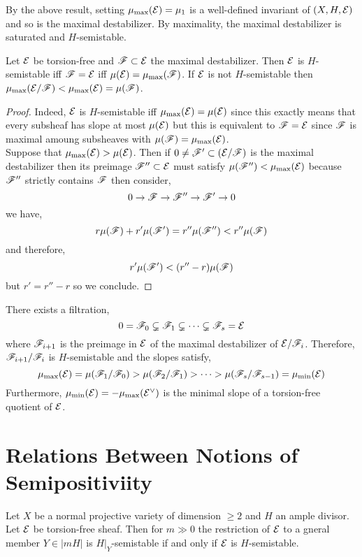 \documentclass[12pt]{article}
\begin{document}
\begin{defn}
By the above result, setting $\mu_{\max}(\mathcal{E}) = \mu_1$ is a well-defined invariant of $(X, H, \mathcal{E})$ and so is the maximal destabilizer. By maximality, the maximal destabilizer is saturated and $H$-semistable.  
\end{defn}

\begin{lemma}
Let $\mathcal{E}$ be torsion-free and $\mathscr{F} \subset \mathcal{E}$ the maximal destabilizer. Then $\mathcal{E}$ is $H$-semistable iff $\mathscr{F} = \mathcal{E}$ iff $\mu(\mathcal{E}) = \mu_{\max}(\mathscr{F})$. If $\mathcal{E}$ is not $H$-semistable then $\mu_{\max}(\mathcal{E}/\mathscr{F}) < \mu_{\max}(\mathcal{E}) = \mu(\mathscr{F})$.
\end{lemma}

\begin{proof}
Indeed, $\mathcal{E}$ is $H$-semistable iff $\mu_{\max}(\mathcal{E}) = \mu(\mathcal{E})$ since this exactly means that every subsheaf has slope at most $\mu(\mathcal{E})$ but this is equivalent to $\mathscr{F} = \mathcal{E}$ since $\mathscr{F}$ is maximal amoung subsheaves with $\mu(\mathscr{F}) = \mu_{\max}(\mathcal{E})$. 
\bigskip\\
Suppose that $\mu_{\max}(\mathcal{E}) > \mu(\mathcal{E})$. Then if $0 \neq \mathscr{F}' \subset (\mathcal{E} / \mathscr{F})$ is the maximal destabilizer then its preimage $\mathscr{F}'' \subset \mathcal{E}$ must satisfy $\mu(\mathscr{F}'') < \mu_{\max}(\mathcal{E})$ because $\mathscr{F}''$ strictly contains $\mathscr{F}$ then consider,
\[ 0 \to \mathscr{F} \to \mathscr{F}'' \to \mathscr{F}' \to 0 \]
we have,
\[ r \mu(\mathscr{F}) + r' \mu(\mathscr{F}') = r'' \mu(\mathscr{F}'') < r'' \mu(\mathscr{F}) \]
and therefore,
\[ r' \mu(\mathscr{F}') < (r'' - r) \mu(\mathscr{F}) \]
but $r' = r'' - r$ so we conclude.
\end{proof}

\begin{cor}
There exists a filtration,
\[ 0 = \mathscr{F}_0 \subsetneq \mathscr{F}_1 \subsetneq \cdots \subsetneq \mathscr{F}_s = \mathcal{E} \]
where $\mathscr{F}_{i+1}$ is the preimage in $\mathcal{E}$ of the maximal destabilizer of $\mathcal{E} / \mathscr{F}_{i}$. Therefore, $\mathscr{F}_{i+1} / \mathscr{F}_i$ is $H$-semistable and the slopes satisfy,
\[ \mu_{\max}(\mathcal{E}) = \mu(\mathscr{F}_1 / \mathscr{F}_0) > \mu(\mathscr{F}_2 / \mathscr{F}_1) > \cdots > \mu(\mathscr{F}_s / \mathscr{F}_{s-1}) = \mu_{\min}(\mathcal{E}) \]
Furthermore, $\mu_{\min}(\mathcal{E}) = - \mu_{\max}(\mathcal{E}^\vee)$ is the minimal slope of a torsion-free quotient of $\mathcal{E}$. 
\end{cor}

\section{Relations Between Notions of Semipositiviity}

\begin{theorem}
Let $X$ be a normal projective variety of dimension $\ge 2$ and $H$ an ample divisor. Let $\mathcal{E}$ be torsion-free sheaf. Then for $m \gg 0$ the restriction of $\mathcal{E}$ to a gneral member $Y \in |mH|$ is $H|_Y$-semistable if and only if $\mathcal{E}$ is $H$-semistable.
\end{theorem}
\end{document}
